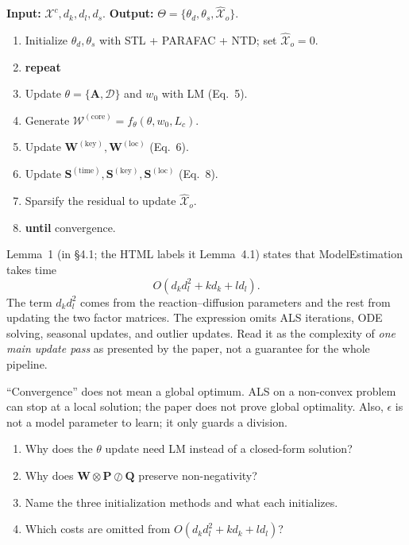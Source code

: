 \begin{tcolorbox}[enhanced,breakable,colback=white,colframe=DTNavy,arc=1.5mm,
  title={\sffamily\bfseries Algorithm 2 --- ModelEstimation (summary)},fonttitle=\small,
  coltitle=white,colbacktitle=DTNavy,left=3mm,right=3mm,top=2mm,bottom=2mm]
\textbf{Input:} $\mathcal{X}^{c},d_k,d_l,d_s$.\quad
\textbf{Output:} $\Theta=\{\theta_d,\theta_s,\widehat{\mathcal{X}}_o\}$.
\begin{enumerate}[leftmargin=1.5em]
  \item Initialize $\theta_d,\theta_s$ with STL + PARAFAC + NTD; set $\widehat{\mathcal{X}}_o=0$.
  \item \textbf{repeat}
  \item \quad Update $\theta=\{\mathbf{A},\mathcal{D}\}$ and $w_0$ with LM (Eq.~5).
  \item \quad Generate $\mathcal{W}^{(\mathrm{core})}=f_\theta(\theta,w_0,L_c)$.
  \item \quad Update $\mathbf{W}^{(\mathrm{key})},\mathbf{W}^{(\mathrm{loc})}$ (Eq.~6).
  \item \quad Update $\mathbf{S}^{(\mathrm{time})},\mathbf{S}^{(\mathrm{key})},
        \mathbf{S}^{(\mathrm{loc})}$ (Eq.~8).
  \item \quad Sparsify the residual to update $\widehat{\mathcal{X}}_o$.
  \item \textbf{until} convergence.
\end{enumerate}
\end{tcolorbox}

Lemma~1 (in §4.1; the HTML labels it Lemma~4.1) states that ModelEstimation takes time
\[
  O(d_k d_l^2+kd_k+ld_l).
\]
The term $d_k d_l^2$ comes from the reaction--diffusion parameters and the rest from updating the two
factor matrices. The expression omits ALS iterations, ODE solving, seasonal updates, and outlier
updates. Read it as the complexity of \emph{one main update pass} as presented by the paper, not a
guarantee for the whole pipeline.

\begin{commonmistake}
``Convergence'' does not mean a global optimum. ALS on a non-convex problem can stop at a local
solution; the paper does not prove global optimality. Also, $\epsilon$ is not a model parameter to
learn; it only guards a division.
\end{commonmistake}

\begin{selfcheck}
\begin{enumerate}
  \item Why does the $\theta$ update need LM instead of a closed-form solution?
  \item Why does $\mathbf{W}\otimes\mathbf{P}\oslash\mathbf{Q}$ preserve non-negativity?
  \item Name the three initialization methods and what each initializes.
  \item Which costs are omitted from $O(d_kd_l^2+kd_k+ld_l)$?
\end{enumerate}
\end{selfcheck}
